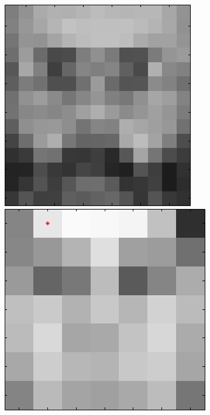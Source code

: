 \begin{figure}[ht]
 \includegraphics[width=\textwidth*11/100]{ch5/figures/XM2VTS_8_1.png}\\
 \includegraphics[width=\textwidth*11/100]{ch5/figures/XM2VTS_1_2.png}

\end{figure}
